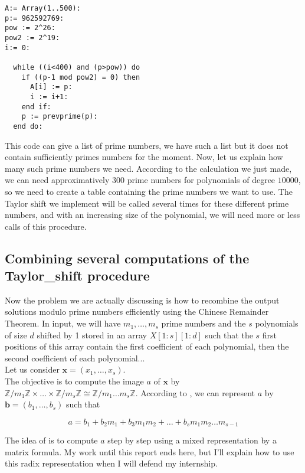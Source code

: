 \begin{verbatim}
A:= Array(1..500):
p:= 962592769:
pow := 2^26:
pow2 := 2^19:
i:= 0:

  while ((i<400) and (p>pow)) do
    if ((p-1 mod pow2) = 0) then
      A[i] := p:
      i := i+1:
    end if:
    p := prevprime(p):
  end do:
\end{verbatim}

This code can give a list of prime numbers, we have such a list but it does not contain sufficiently primes numbers for the moment. Now, let us explain how many such prime numbers we need. According to the calculation we just made, we can need approximatively 300 prime numbers for polynomials of degree $10000$, so we need to create a table containing the prime numbers we want to use. The Taylor shift we implement will be called several times for these different prime numbers, and with an increasing size of the polynomial, we will need more or less calls of this procedure.

\subsection{Combining several computations of the Taylor\_shift procedure}
Now the problem we are actually discussing is how to recombine the output solutions modulo prime numbers efficiently using the Chinese Remainder Theorem. In input,  we will have $m_1,\dots,m_s$ prime numbers and the $s$ polynomials of size $d$ shifted by 1 stored in an array $X[1:s][1:d]$ such that the $s$ first positions of this array contain the first coefficient of each polynomial, then the second coefficient of each polynomial...\\
Let us consider $\textbf{x} = (x_1,\dots,x_s)$. \\

The objective is to compute the image $a$ of $\textbf{x}$ by $\mathbb{Z}/m_1\mathbb{Z} \times \dots \times \mathbb{Z}/m_s\mathbb{Z} \cong \mathbb{Z}/m_1\dots m_s\mathbb{Z}$. According to \cite{RadixRep}, we can represent $a$ by $\textbf{b} = (b_1,\dots,b_s)$ such that

$$a = b_1 + b_2m_1 + b_3m_1m_2 + \dots + b_sm_1m_2\dots m_{s-1}$$

The idea of \cite{RadixRep} is to compute $a$ step by step using a mixed representation by a matrix formula. My work until this report ends here, but I'll explain how to use this radix representation when I will defend my internship.
